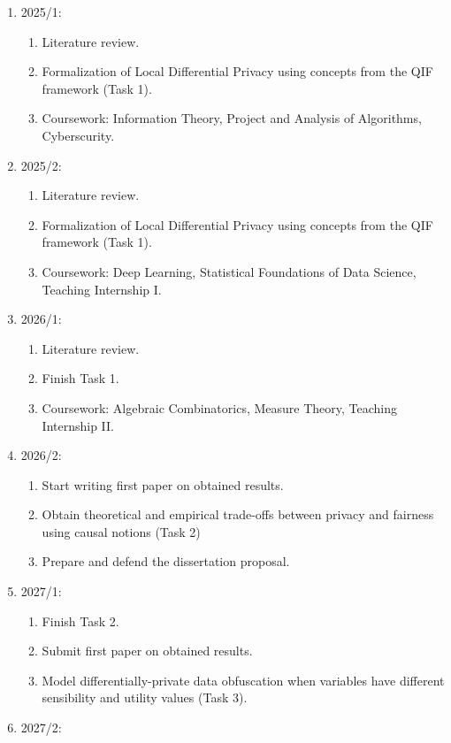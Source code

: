 \documentclass[12pt]{article}
\begin{document}
\begin{enumerate}
\item 2025/1: \begin{enumerate}
    \item Literature review.
    \item Formalization of Local Differential Privacy using concepts from the QIF framework (Task 1).
    \item Coursework: Information Theory, Project and Analysis of Algorithms, Cyberscurity.
    \end{enumerate}
\item 2025/2: \begin{enumerate}
    \item Literature review.
    \item Formalization of Local Differential Privacy using concepts from the QIF framework (Task 1).
    \item Coursework: Deep Learning, Statistical Foundations of Data Science, Teaching Internship I.
    \end{enumerate}
\item 2026/1:  \begin{enumerate}
    \item Literature review.
    \item Finish Task 1. 
    \item Coursework: Algebraic Combinatorics, Measure Theory, Teaching Internship II.
    \end{enumerate}
\item 2026/2:  \begin{enumerate}
    \item Start writing first paper on obtained results.
    \item Obtain theoretical and empirical trade-offs between privacy and fairness using causal notions (Task 2)
    \item Prepare and defend the dissertation proposal.
    \end{enumerate}
\item 2027/1:  \begin{enumerate}
    \item Finish Task 2.
    \item Submit first paper on obtained results.
    \item Model differentially-private data obfuscation when variables have different sensibility and utility values (Task 3).
    \end{enumerate}
\item 2027/2:  \begin{enumerate}

\end{enumerate}
\end{enumerate}
\end{document}
